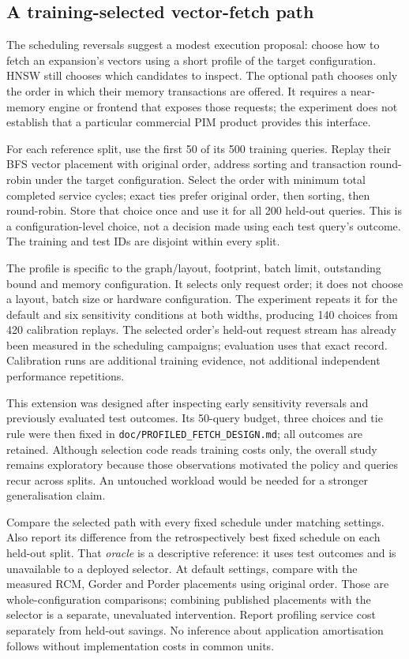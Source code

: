 \subsection{A training-selected vector-fetch path}
\label{sec:profile-protocol}
The scheduling reversals suggest a modest execution proposal: choose how to fetch an expansion's vectors using a short profile of the target configuration. HNSW still chooses which candidates to inspect. The optional path chooses only the order in which their memory transactions are offered. It requires a near-memory engine or frontend that exposes those requests; the experiment does not establish that a particular commercial PIM product provides this interface.

For each reference split, use the first 50 of its 500 training queries. Replay their BFS vector placement with original order, address sorting and transaction round-robin under the target configuration. Select the order with minimum total completed service cycles; exact ties prefer original order, then sorting, then round-robin. Store that choice once and use it for all 200 held-out queries. This is a configuration-level choice, not a decision made using each test query's outcome. The training and test IDs are disjoint within every split.

The profile is specific to the graph/layout, footprint, batch limit, outstanding bound and memory configuration. It selects only request order; it does not choose a layout, batch size or hardware configuration. The experiment repeats it for the default and six sensitivity conditions at both widths, producing 140 choices from 420 calibration replays. The selected order's held-out request stream has already been measured in the scheduling campaigns; evaluation uses that exact record. Calibration runs are additional training evidence, not additional independent performance repetitions.

This extension was designed after inspecting early sensitivity reversals and previously evaluated test outcomes. Its 50-query budget, three choices and tie rule were then fixed in \texttt{doc/PROFILED\_FETCH\_DESIGN.md}; all outcomes are retained. Although selection code reads training costs only, the overall study remains exploratory because those observations motivated the policy and queries recur across splits. An untouched workload would be needed for a stronger generalisation claim.

Compare the selected path with every fixed schedule under matching settings. Also report its difference from the retrospectively best fixed schedule on each held-out split. That \emph{oracle} is a descriptive reference: it uses test outcomes and is unavailable to a deployed selector. At default settings, compare with the measured RCM, Gorder and Porder placements using original order. Those are whole-configuration comparisons; combining published placements with the selector is a separate, unevaluated intervention. Report profiling service cost separately from held-out savings. No inference about application amortisation follows without implementation costs in common units.

